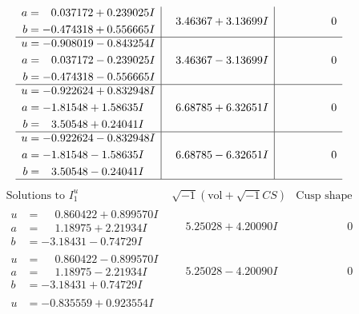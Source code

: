 \documentclass[1p]{elsarticle_modified}
\theoremstyle{definition}
\newcommand{\I}{\sqrt{-1}}
\begin{document}
$$\begin{array}{c|c|c}
\begin{aligned}
a &= \phantom{-}0.037172 + 0.239025 I \\
b &= -0.474318 + 0.556665 I\end{aligned}
 & \phantom{-}3.46367 + 3.13699 I & \phantom{-0.000000 } 0 \\ \hline\begin{aligned}
u &= -0.908019 - 0.843254 I \\
a &= \phantom{-}0.037172 - 0.239025 I \\
b &= -0.474318 - 0.556665 I\end{aligned}
 & \phantom{-}3.46367 - 3.13699 I & \phantom{-0.000000 } 0 \\ \hline\begin{aligned}
u &= -0.922624 + 0.832948 I \\
a &= -1.81548 + 1.58635 I \\
b &= \phantom{-}3.50548 + 0.24041 I\end{aligned}
 & \phantom{-}6.68785 + 6.32651 I & \phantom{-0.000000 } 0 \\ \hline\begin{aligned}
u &= -0.922624 - 0.832948 I \\
a &= -1.81548 - 1.58635 I \\
b &= \phantom{-}3.50548 - 0.24041 I\end{aligned}
 & \phantom{-}6.68785 - 6.32651 I & \phantom{-0.000000 } 0\\
 \hline 
 \end{array}$$\newpage$$\begin{array}{c|c|c}  
\text{Solutions to }I^u_{1}& \I (\text{vol} + \sqrt{-1}CS) & \text{Cusp shape}\\
 \hline 
\begin{aligned}
u &= \phantom{-}0.860422 + 0.899570 I \\
a &= \phantom{-}1.18975 + 2.21934 I \\
b &= -3.18431 - 0.74729 I\end{aligned}
 & \phantom{-}5.25028 + 4.20090 I & \phantom{-0.000000 } 0 \\ \hline\begin{aligned}
u &= \phantom{-}0.860422 - 0.899570 I \\
a &= \phantom{-}1.18975 - 2.21934 I \\
b &= -3.18431 + 0.74729 I\end{aligned}
 & \phantom{-}5.25028 - 4.20090 I & \phantom{-0.000000 } 0 \\ \hline\begin{aligned}
u &= -0.835559 + 0.923554 I \\

\end{aligned}
\end{array}$$
\end{document}
